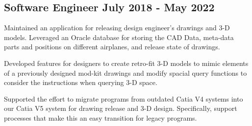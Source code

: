 \subsection{{Software Engineer \hfill July 2018 - May 2022}}
\begin{zitemize}
\item Maintained an application for releasing design engineer's drawings and 3-D models. Leveraged an Oracle database for storing the CAD Data, meta-data parts and positions on different airplanes, and release state of drawings.
\item Developed features for designers to create retro-fit 3-D models to mimic elements of a previously designed mod-kit drawings and modify spacial query functions to consider the instructions when querying 3-D space.
\item Supported the effort to migrate programs from outdated Catia V4 systems into our Catia V5 system for drawing release and 3-D design. Specifically, support processes that make this an easy transition for legacy programs.
\end{zitemize}


